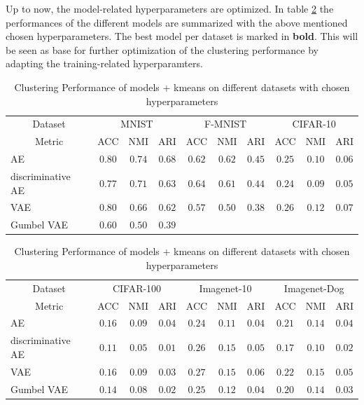 \documentclass[12pt,DIV14,BCOR12mm,a4paper,footexclude,headinclude,halfparskip-,twoside,openright,openany,cleardoubleempty,idxtotoc,bibtotoc]{scrreprt} %
\numberwithin{equation}{chapter}
\begin{document}
Up to now, the model-related hyperparameters are optimized. In table \ref{tab:ClusterPerformance_Models_ModelrelatedParams} the performances of the different models are summarized with the above mentioned chosen hyperparameters. The best model per dataset is marked in \textbf{bold}. This will be seen as base for further optimization of the clustering performance by adapting the training-related hyperparamters.
		\begin{table}[htb!]
    		\centering
    		\caption{Clustering Performance of models + kmeans on different datasets with chosen hyperparameters}
    		\label{tab:ClusterPerformance_Models_ModelrelatedParams}
    		\begin{tabular}{l|ccccccccc}
    			\toprule
    			\multicolumn{1}{c}{Dataset} & \multicolumn{3}{c}{MNIST} & \multicolumn{3}{c}{F-MNIST} & \multicolumn{3}{c}{CIFAR-10}\\
        		\multicolumn{1}{c}{Metric} & ACC & NMI & ARI & ACC & NMI & ARI & ACC & NMI & ARI\\
        		\midrule
    			AE & $\mathbf{0.80}$ & $\mathbf{0.74}$ & $\mathbf{0.68}$ & $0.62$ & $\mathbf{0.62}$ & $\mathbf{0.45}$ & $0.25$ & $0.10$ & $0.06$\\
        		discriminative AE & $0.77$ & $0.71$ & $0.63$ & $\mathbf{0.64}$ & $0.61$ & $0.44$ & $0.24$ & $0.09$ & $0.05$\\
        		VAE & $0.80$ & $0.66$ & $0.62$ & $0.57$ & $0.50$ & $0.38$ & $\mathbf{0.26}$ & $\mathbf{0.12}$ & $\mathbf{0.07}$\\
        		Gumbel VAE & $0.60$ & $0.50$ & $0.39$\\
        		\bottomrule
    		\end{tabular}    		
    		\begin{tabular}{l|ccccccccc}
    			\toprule
    			\multicolumn{1}{c}{Dataset} & \multicolumn{3}{c}{CIFAR-100} & \multicolumn{3}{c}{Imagenet-10} & \multicolumn{3}{c}{Imagenet-Dog}\\
        		\multicolumn{1}{c}{Metric} & ACC & NMI & ARI & ACC & NMI & ARI & ACC & NMI & ARI\\
        		\midrule
    			AE & $\mathbf{0.16}$ & $\mathbf{0.09}$ & $\mathbf{0.04}$ & $0.24$ & $0.11$ & $0.04$ & $0.21$ & $0.14$ & $0.04$\\
        		discriminative AE & $0.11$ & $0.05$ & $0.01$ & $0.26$ & $\mathbf{0.15}$ & $0.05$ & $0.17$ & $0.10$ & $0.02$\\
        		VAE & $\mathbf{0.16}$ & $\mathbf{0.09}$ & $0.03$ & $\mathbf{0.27}$ & $\mathbf{0.15}$ & $\mathbf{0.06}$ & $\mathbf{0.22}$ & $\mathbf{0.15}$ & $\mathbf{0.05}$\\
        		Gumbel VAE & $0.14$ & $0.08$ & $0.02$ & $0.25$ & $0.12$ & $0.04$ & $0.20$ & $0.14$ & $0.03$\\
        		\bottomrule
    		\end{tabular}
	\end{table}
\end{document}

